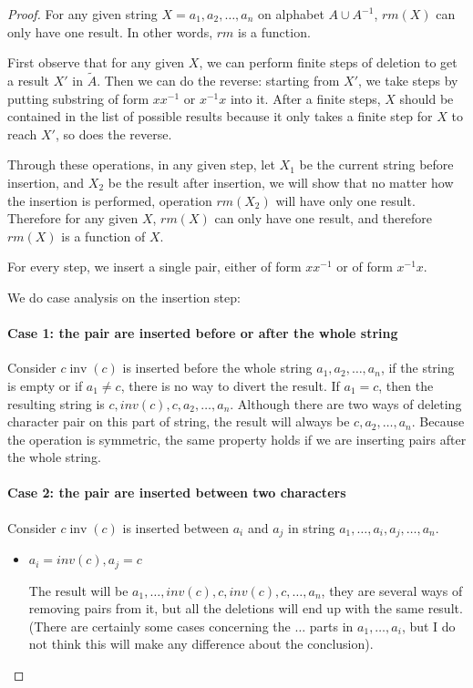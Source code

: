 \documentclass[11pt]{article}
\begin{document}
\begin{proof}
For any given string $X = a_1,a_2,\ldots,a_n$ on alphabet $A \cup A^{-1}$,
$rm(X)$ can only have one result. In other words, $rm$ is a function.

First observe that for any given $X$, we can perform finite steps
of deletion to get a result $X'$ in $\tilde{A}$. Then we can do the
reverse: starting from $X'$, we take steps by putting substring of form $x x^{-1}$ or
$x^{-1} x$ into it. After a finite steps, $X$ should be contained in the list of
possible results because it only takes a finite step for $X$ to reach $X'$,
so does the reverse.

Through these operations, in any given step, let $X_1$ be the current
string before insertion, and $X_2$ be the result after insertion,
we will show that no matter how the insertion is performed, operation $rm(X_2)$
will have only one result. Therefore for any given $X$, $rm(X)$ can only have
one result, and therefore $rm(X)$ is a function of $X$.

For every step, we insert a single pair, either of form $x x^{-1}$ or of form
$x^{-1} x$.

We do case analysis on the insertion step:

\paragraph{Case 1: the pair are inserted before or after the whole string}
Consider $c \mathop{inv}(c)$ is inserted before the whole string $a_1,a_2,\ldots,a_n$,
if the string is empty or if $a_1 \neq c$, there is no way to divert the result.
If $a_1 = c$, then the resulting string is $c,inv(c),c,a_2,\ldots,a_n$.
Although there are two ways of deleting character pair on this part of string,
the result will always be $c,a_2,\ldots,a_n$. Because the operation is symmetric,
the same property holds if we are inserting pairs after the whole string.

\paragraph{Case 2: the pair are inserted between two characters}
Consider $c \mathop{inv}(c)$ is inserted between $a_i$ and $a_j$ in string
$a_1,\ldots,a_i,a_j,\ldots,a_n$.

\begin{itemize}
  \item{$a_i = inv(c), a_j = c$}

    The result will be $a_1,\ldots,inv(c),c,inv(c),c,\ldots,a_n$,
    they are several ways of removing pairs from it, but all the deletions
    will end up with the same result. (There are certainly some cases concerning
    the $\ldots$ parts in $a_1,\ldots,a_i$, but I do not think this will make any difference
    about the conclusion).


\end{itemize}
\end{proof}
\end{document}
